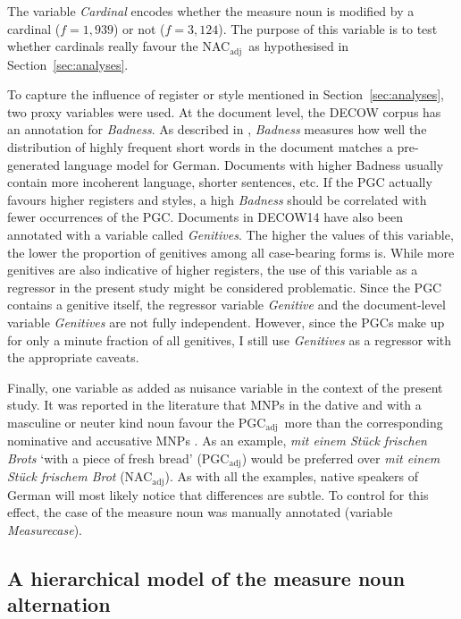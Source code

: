 \documentclass[USenglish]{article}
\newcommand{\Sub}[1]{\ensuremath{\mathrm{_{#1}}}}
\newcommand{\NACa}{NAC\Sub{adj}}
\newcommand{\PGCa}{PGC\Sub{adj}}
\begin{document}
The variable \textit{Cardinal} encodes whether the measure noun is modified by a cardinal ($f=1,939$) or not ($f=3,124$).
The purpose of this variable is to test whether cardinals really favour the \NACa\ as hypothesised in Section~\ref{sec:analyses}.

To capture the influence of register or style mentioned in Section~\ref{sec:analyses}, two proxy variables were used.
At the document level, the DECOW corpus has an annotation for \textit{Badness}.
As described in \cite{SchaeferEa2013}, \textit{Badness} measures how well the distribution of highly frequent short words in the document matches a pre-generated language model for German.
Documents with higher Badness usually contain more incoherent language, shorter sentences, etc.
If the PGC actually favours higher registers and styles, a high \textit{Badness} should be correlated with fewer occurrences of the PGC.
Documents in DECOW14 have also been annotated with a variable called \textit{Genitives}.
The higher the values of this variable, the lower the proportion of genitives among all case-bearing forms is.
While more genitives are also indicative of higher registers, the use of this variable as a regressor in the present study might be considered problematic.
Since the PGC contains a genitive itself, the regressor variable \textit{Genitive} and the document-level variable \textit{Genitives} are not fully independent.
However, since the PGCs make up for only a minute fraction of all genitives, I still use \textit{Genitives} as a regressor with the appropriate caveats.

Finally, one variable as added as nuisance variable in the context of the present study.
It was reported in the literature that MNPs in the dative and with a masculine or neuter kind noun favour the \PGCa\ more than the corresponding nominative and accusative MNPs \citep{Hentschel1993,Zimmer2015}.
As an example, \textit{mit einem Stück frischen Brots} `with a piece of fresh bread' (\PGCa) would be preferred over \textit{mit einem Stück frischem Brot} (\NACa).
As with all the examples, native speakers of German will most likely notice that differences are subtle.
To control for this effect, the case of the measure noun was manually annotated (variable \textit{Measurecase}).




\subsection{A hierarchical model of the measure noun alternation}
\label{sec:corpushierarchicalmodel}
\end{document}

